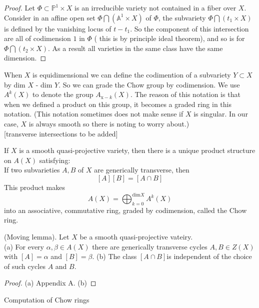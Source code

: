 \documentclass[12pt]{article}
\begin{document}
\begin{proof}
    Let $\Phi \subset \mathbb{P}^{1} \times X $ is an irreducible variety not contained in a fiber over $X$. Consider in an affine open set $\Phi \bigcap(\mathbb{A}^{1} \times X)$ of $\Phi$, the subvariety $\Phi \bigcap ({t_{1}} \times X)$ is defined by the vanishing locus of $t - t_{1}$. So the component of this intersection are all of codimension $1$ in $\Phi$ ( this is by principle ideal theorem), and so is for $\Phi \bigcap ({t_{2}} \times X)$. As a result all varieties in the same class have the same dimension.
\end{proof}

When $X$ is equidimensional we can define the codimention of a subvariety $Y \subset X$ by dim $X$ - dim $Y$. So we can grade the Chow group by codimension. We use $A^{k}(X)$ to denote the group $A_{\text{x}-k}(X)$. The reason of this notation is that when we defined a product on this group, it becomes a graded ring in this notation. (This notation sometimes does not make sense if $X$ is singular. In our case, $X$ is always smooth so there is noting to worry about.)\\

[transverse intersections to be added]
\begin{thm}
    If $X$ is a smooth quasi-projective variety, then there is a unique product structure on $A(X)$ satisfying:\\
    If two subvarieties $A,B$ of $X$ are generically transverse, then 
    \[ [A][B] = [A \cap B ]\]
    This product makes
    \[   A(X) = \bigoplus^{\text{dim}X}_{k=0}A^{k}(X)\]
    into an associative, commutative ring, graded by codimension, called the Chow ring.
\end{thm}

\begin{thm}
    (Moving lemma). Let $X$ be a smooth quasi-projective vateiry.\\
    (a) For every $\alpha, \beta \in A(X)$ there are generically transverse cycles $A, B \in Z(X)$ with $[A] = \alpha$ and $[B] = \beta$.
    (b) The class $[A\cap B] $is independent of the choice of such cycles $A$ and $B$.
\end{thm}

\begin{proof}
    (a)\cite{3264} Appendix A.
    (b)\cite{fulton} 
\end{proof}



Computation of Chow rings
\end{document}

